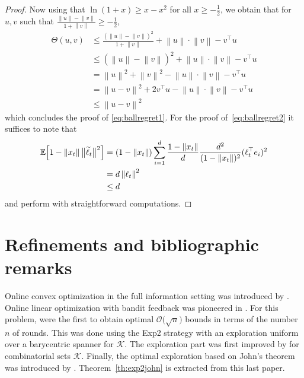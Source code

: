 \documentclass[11pt]{hackednow}
\newcommand{\E}{\mathbb{E}}
\newcommand{\cK}{\mathcal{K}}
\renewcommand{\tilde}{\widetilde}
\newcommand{\norm}[1]{\left\|{#1}\right\|}
\begin{document}
\begin{proof}
Now using that $\ln(1+x) \geq x -x^2$ for all $x \geq - \frac12$, we obtain that for $u,v$ such that $\frac{\norm{u} - \norm{v}}{1 + \norm{v}} \geq - \frac{1}{2}$,
\begin{align*}
\Theta(u,v) & \leq \frac{(\norm{u} - \norm{v})^2}{1 + \norm{v}} + \norm{u} \cdot \norm{v} - v^{\top} u \\ 
& \leq (\norm{u} - \norm{v})^2 + \norm{u} \cdot \norm{v} - v^{\top} u \\
& = \norm{u}^2 + \norm{v}^2 - \norm{u} \cdot \norm{v} - v^{\top} u \\
& = \norm{u - v}^2 + 2 v^{\top} u - \norm{u} \cdot \norm{v} - v^{\top} u \\
& \leq \norm{u - v}^2
\end{align*}
which concludes the proof of \eqref{eq:ballregret1}. For the proof of~\eqref{eq:ballregret2} it suffices to note that
\begin{align*}
\E\Bigl[1 - \norm{x_t}\big\|\tilde{\ell}_t\big\|^2\Bigr]  & = (1- \norm{x_t}) \sum_{i=1}^d  \frac{1 - \norm{x_t}}{d} \frac{d^2}{(1 - \norm{x_t})^2} (\ell_t^{\top} e_i)^2 \\
&  = d \norm{\ell_t}^2 \\
& \le d
\end{align*}
and perform with straightforward computations.
\end{proof}

\section{Refinements and bibliographic remarks}
Online convex optimization in the full information setting was introduced by \cite{Zin03}. Online linear optimization with bandit feedback was pioneered in \cite{AK04, MB04}. For this problem, \cite{DHK08} were the first to obtain optimal $\mathcal{O}\bigl(\sqrt{n}\bigr)$ bounds in terms of the number $n$ of rounds. This was done using the Exp2 strategy with an exploration uniform over a barycentric spanner for $\cK$. The exploration part was first improved by \cite{CL11} for combinatorial sets $\cK$. Finally, the optimal exploration based on John's theorem was introduced by \cite{BCK12}. Theorem~\ref{th:exp2john} is extracted from this last paper.
\end{document}
